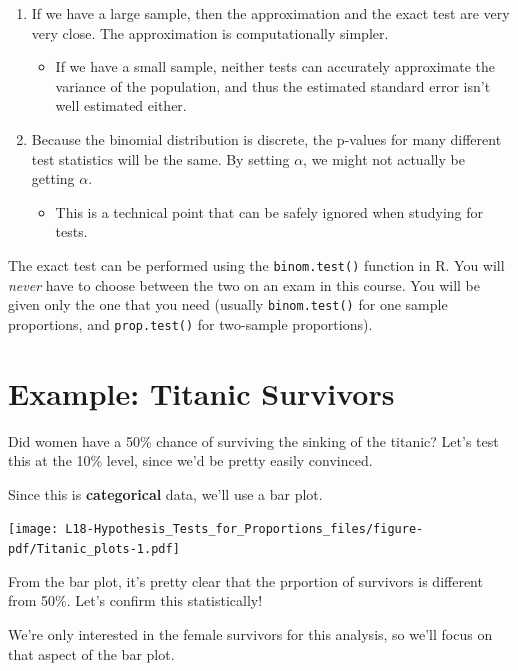 \documentclass[
  letterpaper,
  DIV=11,
  numbers=noendperiod,
  oneside]{scrreprt}
\providecommand{\tightlist}{%
  \setlength{\itemsep}{0pt}\setlength{\parskip}{0pt}}\usepackage{longtable,booktabs,array}
\begin{document}
\begin{enumerate}
\def\labelenumi{\arabic{enumi}.}
\tightlist
\item
  If we have a large sample, then the approximation and the exact test
  are very very close. The approximation is computationally simpler.

  \begin{itemize}
  \tightlist
  \item
    If we have a small sample, neither tests can accurately approximate
    the variance of the population, and thus the estimated standard
    error isn't well estimated either.
  \end{itemize}
\item
  Because the binomial distribution is discrete, the p-values for many
  different test statistics will be the same. By setting \(\alpha\), we
  might not actually be getting \(\alpha\).

  \begin{itemize}
  \tightlist
  \item
    This is a technical point that can be safely ignored when studying
    for tests.
  \end{itemize}
\end{enumerate}

The exact test can be performed using the \texttt{binom.test()} function
in R. You will \emph{never} have to choose between the two on an exam in
this course. You will be given only the one that you need (usually
\texttt{binom.test()} for one sample proportions, and
\texttt{prop.test()} for two-sample proportions).

\hypertarget{example-titanic-survivors}{%
\section{Example: Titanic Survivors}\label{example-titanic-survivors}}

Did women have a 50\% chance of surviving the sinking of the titanic?
Let's test this at the 10\% level, since we'd be pretty easily
convinced.

Since this is \textbf{categorical} data, we'll use a bar plot.

\texttt{[image: L18-Hypothesis\_Tests\_for\_Proportions\_files/figure-pdf/Titanic\_plots-1.pdf]}

From the bar plot, it's pretty clear that the prportion of survivors is
different from 50\%. Let's confirm this statistically!

We're only interested in the female survivors for this analysis, so
we'll focus on that aspect of the bar plot.
\end{document}
